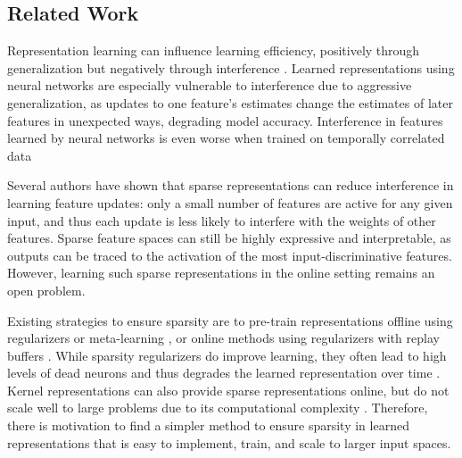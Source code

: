 \documentclass{article}
\begin{document}
\subsection{Related Work} \label{sub-sec:related work}
Representation learning can influence learning efficiency, positively through generalization but negatively through interference \cite[]{bullinaria1995, iCaRL2016, le2017, liu2019}.
Learned representations using neural networks are especially vulnerable to interference due to aggressive generalization, as updates to one feature’s estimates change the estimates of later features in unexpected ways, degrading model accuracy.
Interference in features learned by neural networks is even worse when trained on temporally correlated data \cite[]{liu2020, bengio2020, zhang2022}

Several authors \cite[]{ghiassian2020,liu2019,javed2019,sutton2019}
have shown that sparse representations can reduce interference in learning feature updates: only a small number of features are active for any given input,
and thus each update is less likely to interfere with the weights of other features. Sparse feature spaces can still be highly expressive and interpretable,
as outputs can be traced to the activation of the most input-discriminative features.
However, learning such sparse representations in the online setting remains an open problem.

Existing strategies to ensure sparsity are to pre-train representations offline using regularizers \cite[]{liu2019} or meta-learning \cite{javed2019},
or online methods using regularizers with replay buffers \cite{sutton2019}. While sparsity regularizers do improve learning,
they often lead to high levels of dead neurons and thus degrades the learned representation over time \cite[]{sutton2019}.
Kernel representations can also provide sparse representations online, but do not scale well to large problems due to its computational complexity \cite[]{pan2019fuzzy}.
Therefore, there is motivation to find a simpler method to ensure sparsity in learned representations that is easy to implement, train, and scale to larger input spaces.
\end{document}
